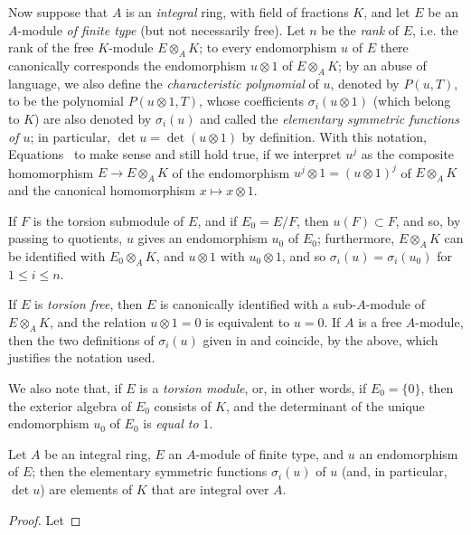 \begin{env}[6.4.2]
\label{II.6.4.2}
Now suppose that $A$ is an \emph{integral} ring, with field of fractions $K$, and let $E$ be an $A$-module \emph{of finite type} (but not necessarily free).
Let $n$ be the \emph{rank} of $E$, i.e. the rank of the free $K$-module $E\otimes_A K$;
to every endomorphism $u$ of $E$ there canonically corresponds the endomorphism $u\otimes1$ of $E\otimes_A K$;
by an abuse of language, we also define the \emph{characteristic polynomial} of $u$, denoted by $P(u,T)$, to be the polynomial $P(u\otimes1,T)$, whose coefficients $\sigma_i(u\otimes1)$ (which belong to $K$) are also denoted by $\sigma_i(u)$ and called the \emph{elementary symmetric functions of $u$};
in particular, $\det u=\det(u\otimes1)$ by definition.
With this notation, Equations~ to  make sense and still hold true, if we interpret $u^j$ as the composite homomorphism $E\to E\otimes_A K$ of the endomorphism $u^j\otimes1=(u\otimes1)^j$ of $E\otimes_A K$ and the canonical homomorphism $x\mapsto x\otimes1$.

If $F$ is the torsion submodule of $E$, and if $E_0=E/F$, then $u(F)\subset F$, and so, by passing to quotients, $u$ gives an endomorphism $u_0$ of $E_0$;
furthermore, $E\otimes_A K$ can be identified with $E_0\otimes_A K$, and $u\otimes1$ with $u_0\otimes1$, and so $\sigma_i(u)=\sigma_i(u_0)$ for $1\leq i\leq n$.

If $E$ is \emph{torsion free}, then $E$ is canonically identified with a sub-$A$-module of $E\otimes_A K$, and the relation $u\otimes1=0$ is equivalent to $u=0$.
If $A$ is a free $A$-module, then the two definitions of $\sigma_i(u)$ given in  and  coincide, by the above, which justifies the notation used.

We also note that, if $E$ is a \emph{torsion module}, or, in other words, if $E_0=\{0\}$, then the exterior algebra of $E_0$ consists of $K$, and the determinant of the unique endomorphism $u_0$ of $E_0$ is \emph{equal to $1$}.
\end{env}

\begin{proposition}[6.4.3]
\label{II.6.4.3}
Let $A$ be an integral ring, $E$ an $A$-module of finite type, and $u$ an endomorphism of $E$;
then the elementary symmetric functions $\sigma_i(u)$ of $u$ (and, in particular, $\det u$) are elements of $K$ that are integral over $A$.
\end{proposition}

\begin{proof}
Let
\end{proof}






